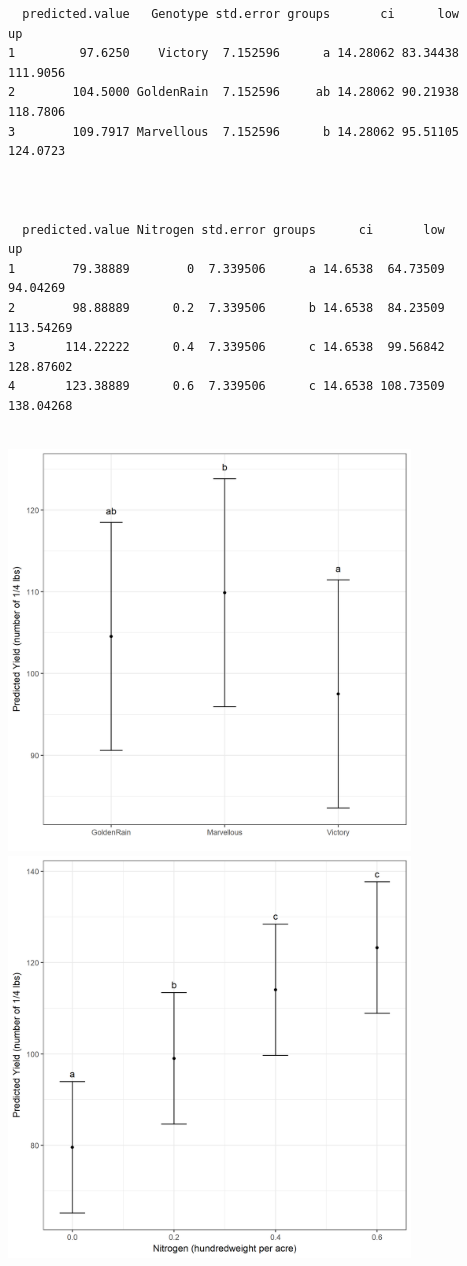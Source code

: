 \documentclass[a4paper, 10pt, fleqn, twosided]{memoir}
\begin{document}
\begin{tcolorbox}[title = Exercise 13 output continued]
\begin{verbatim}
  predicted.value   Genotype std.error groups       ci      low       up
1         97.6250    Victory  7.152596      a 14.28062 83.34438 111.9056
2        104.5000 GoldenRain  7.152596     ab 14.28062 90.21938 118.7806
3        109.7917 Marvellous  7.152596      b 14.28062 95.51105 124.0723



  predicted.value Nitrogen std.error groups      ci       low        up
1        79.38889        0  7.339506      a 14.6538  64.73509  94.04269
2        98.88889      0.2  7.339506      b 14.6538  84.23509 113.54269
3       114.22222      0.4  7.339506      c 14.6538  99.56842 128.87602
4       123.38889      0.6  7.339506      c 14.6538 108.73509 138.04268


\end{verbatim}
\end{tcolorbox}

\begin{tcolorbox}[title = Exercise 13 output continued]
\includegraphics[width=0.8\textwidth, frame]{Exercise13GenoPred.png}
\includegraphics[width=0.8\textwidth, frame]{Exercise13NitroPred.png}
\end{tcolorbox}
\end{document}
